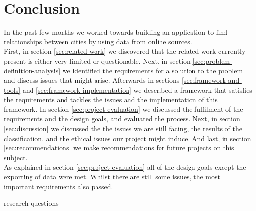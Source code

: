 \chapter{Conclusion}
In the past few months we worked towards building an application to find relationships between cities by using data from online sources.  \\


First, in section \ref{sec:related work} we discovered that the related work currently present is either very limited or questionable. Next, in section \ref{sec:problem-definition-analysis} we identified the requirements for a solution to the problem and discuss issues that might arise. Afterwards in sections \ref{sec:framework-and-tools} and \ref{sec:framework-implementation} we described a framework that satisfies the requirements and tackles the issues and the implementation of this framework. In section \ref{sec:project-evaluation} we discussed the fulfilment of the requirements and the design goals, and evaluated the process. Next, in section \ref{sec:discussion} we discussed the the issues we are still facing, the results of the classification, and the ethical issues our project might induce. And last, in section \ref{sec:recommendations} we make recommendations for future projects on this subject. \\

As explained in section \ref{sec:project-evaluation} all of the design goals except the exporting of data were met. Whilst there are still some issues, the most important requirements also passed.  %



research questions \\




